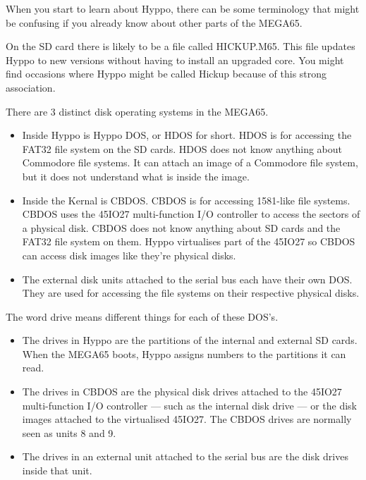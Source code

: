 When you start to learn about Hyppo, there can be some terminology that might be
confusing if you already know about other parts of the MEGA65.

On the SD card there is likely to be a file called HICKUP.M65. This file updates
Hyppo to new versions without having to install an upgraded core. You might find
occasions where Hyppo might be called Hickup because of this strong association.

There are 3 distinct disk operating systems in the MEGA65.

\begin{itemize}
  \item Inside Hyppo is Hyppo DOS, or HDOS for short. HDOS is for accessing
        the FAT32 file system on the SD cards. HDOS does not know anything
        about Commodore file systems. It can attach an image of a Commodore
        file system, but it does not understand what is inside the image.
  \item Inside the Kernal is CBDOS. CBDOS is for accessing 1581-like file
        systems. CBDOS uses the 45IO27 multi-function I/O controller to access
        the sectors of a physical disk. CBDOS does not know anything about SD
        cards and the FAT32 file system on them. Hyppo virtualises part of the
        45IO27 so CBDOS can access disk images like they're physical disks.
  \item The external disk units attached to the serial bus each have their own
        DOS. They are used for accessing the file systems on their respective
        physical disks.
\end{itemize}

The word drive means different things for each of these DOS's.

\begin{itemize}
  \item The drives in Hyppo are the partitions of the internal and external SD
        cards. When the MEGA65 boots, Hyppo assigns numbers to the partitions
        it can read.
  \item The drives in CBDOS are the physical disk drives attached to the 45IO27
        multi-function I/O controller --- such as the internal disk drive ---
        or the disk images attached to the virtualised 45IO27. The CBDOS drives
        are normally seen as units 8 and 9.
  \item The drives in an external unit attached to the serial bus are the
        disk drives inside that unit.
\end{itemize}

